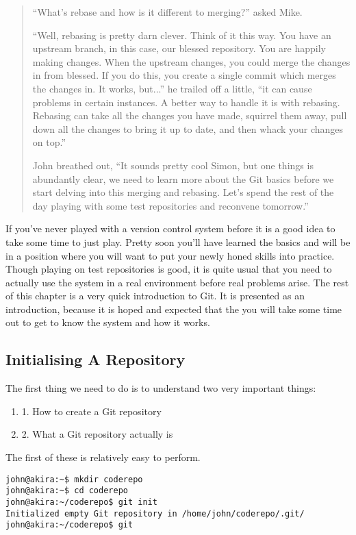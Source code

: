 \begin{quote}
``What's rebase and how is it different to merging?'' asked Mike. 

``Well, rebasing is pretty darn clever.  Think of it this way.  You have an upstream branch, in this case, our blessed repository.  You are happily making changes.  When the upstream changes, you could merge the changes in from blessed.  If you do this, you create a single commit which merges the changes in.  It works, but...'' he trailed off a little, ``it can cause problems in certain instances.  A better way to handle it is with rebasing.  Rebasing can take all the changes you have made, squirrel them away, pull down all the changes to bring it up to date, and then whack your changes on top.''

John breathed out, ``It sounds pretty cool Simon, but one things is abundantly clear, we need to learn more about the Git basics before we start delving into this merging and rebasing.  Let's spend the rest of the day playing with some test repositories and reconvene tomorrow.''
\end{quote}

If you've never played with a version control system before it is a good idea to take some time to just play.  Pretty soon you'll have learned the basics and will be in a position where you will want to put your newly honed skills into practice.  Though playing on test repositories is good, it is quite usual that you need to actually use the system in a real environment before real problems arise.  The rest of this chapter is a very quick introduction to Git.  It is presented as an introduction, because it is hoped and expected that the you will take some time out to get to know the system and how it works. 

\subsection*{Initialising A Repository}
The first thing we need to do is to understand two very important things: 

\begin{enumerate}
  \item 1. How to create a Git repository 
  \item 2. What a Git repository actually is 
\end{enumerate}

The first of these is relatively easy to perform.  

\begin{verbatim} 
john@akira:~$ mkdir coderepo 
john@akira:~$ cd coderepo 
john@akira:~/coderepo$ git init 
Initialized empty Git repository in /home/john/coderepo/.git/ 
john@akira:~/coderepo$ git 
\end{verbatim} 

